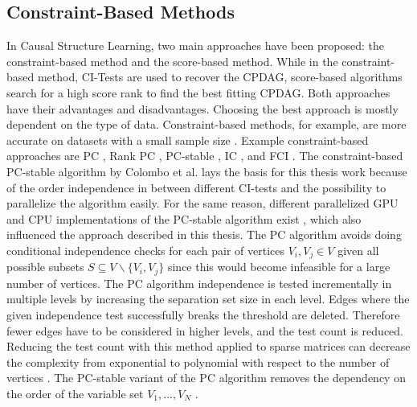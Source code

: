 \subsection{Constraint-Based Methods}
In Causal Structure Learning, two main approaches have been proposed: the constraint-based method and the score-based method. While in the constraint-based method, CI-Tests are used to recover the CPDAG, score-based algorithms search for a high score rank to find the best fitting CPDAG. Both approaches have their advantages and disadvantages. Choosing the best approach is mostly dependent on the type of data. Constraint-based methods, for example, are more accurate on datasets with a small sample size \cite{scutariBayesianNetworkConstraintBased2017}. Example constraint-based approaches are PC \cite{spirtesCausationPredictionSearch1993}, Rank PC \cite{harrisPCAlgorithmNonparanormal}, PC-stable \cite{colomboOrderIndependentConstraintBasedCausal}, IC \cite{vermaEquivalenceSynthesisCausal1990}, and FCI \cite{spirtesCausationPredictionSearch1993}.
The constraint-based PC-stable algorithm by Colombo et al. \cite{colomboOrderIndependentConstraintBasedCausal} lays the basis for this thesis work because of the order independence in between different CI-tests and the possibility to parallelize the algorithm easily. For the same reason, different parallelized GPU and CPU implementations of the PC-stable algorithm exist \cite{schmidtLoadBalancedParallelConstraintBased2019,schmidtOrderIndependentConstraintBasedCausal2018,zarebavaniCuPCCUDAbasedParallel2018}, which also influenced the approach described in this thesis.
The PC algorithm avoids doing conditional independence checks for each pair of vertices $V_i, V_j \in V$ given all possible subsets $S \subseteq V \backslash \{V_i, V_j\}$ \cite{pearlTheoryInferredCausation1995} since this would become infeasible for a large number of vertices. The PC algorithm independence is tested incrementally in multiple levels by increasing the separation set size in each level. Edges where the given independence test successfully breaks the threshold are deleted. Therefore fewer edges have to be considered in higher levels, and the test count is reduced. Reducing the test count with this method applied to sparse matrices can decrease the complexity from exponential to polynomial with respect to the number of vertices \cite{kalischEstimatingHighDimensionalDirected2007}.
The PC-stable variant of the PC algorithm removes the dependency on the order of the variable set $V_1, ...,V_N$ \cite{colomboOrderIndependentConstraintBasedCausal,schmidtOrderIndependentConstraintBasedCausal2018}.

